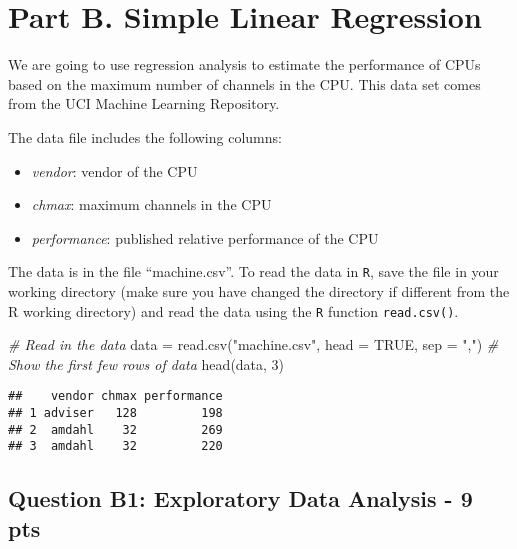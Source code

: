 \documentclass[
]{article}
\newenvironment{Shaded}{\begin{snugshade}}{\end{snugshade}}
\newcommand{\AttributeTok}[1]{\textcolor[rgb]{0.77,0.63,0.00}{#1}}
\newcommand{\CommentTok}[1]{\textcolor[rgb]{0.56,0.35,0.01}{\textit{#1}}}
\newcommand{\ConstantTok}[1]{\textcolor[rgb]{0.00,0.00,0.00}{#1}}
\newcommand{\DecValTok}[1]{\textcolor[rgb]{0.00,0.00,0.81}{#1}}
\newcommand{\FunctionTok}[1]{\textcolor[rgb]{0.00,0.00,0.00}{#1}}
\newcommand{\NormalTok}[1]{#1}
\newcommand{\OtherTok}[1]{\textcolor[rgb]{0.56,0.35,0.01}{#1}}
\newcommand{\StringTok}[1]{\textcolor[rgb]{0.31,0.60,0.02}{#1}}
\providecommand{\tightlist}{%
  \setlength{\itemsep}{0pt}\setlength{\parskip}{0pt}}
\begin{document}
\hypertarget{part-b.-simple-linear-regression}{%
\section{Part B. Simple Linear
Regression}\label{part-b.-simple-linear-regression}}

We are going to use regression analysis to estimate the performance of
CPUs based on the maximum number of channels in the CPU. This data set
comes from the UCI Machine Learning Repository.

The data file includes the following columns:

\begin{itemize}
\tightlist
\item
  \emph{vendor}: vendor of the CPU
\item
  \emph{chmax}: maximum channels in the CPU
\item
  \emph{performance}: published relative performance of the CPU
\end{itemize}

The data is in the file ``machine.csv''. To read the data in \texttt{R},
save the file in your working directory (make sure you have changed the
directory if different from the R working directory) and read the data
using the \texttt{R} function \texttt{read.csv()}.

\begin{Shaded}
\begin{Highlighting}[]
\CommentTok{\# Read in the data}
\NormalTok{data }\OtherTok{=} \FunctionTok{read.csv}\NormalTok{(}\StringTok{"machine.csv"}\NormalTok{, }\AttributeTok{head =} \ConstantTok{TRUE}\NormalTok{, }\AttributeTok{sep =} \StringTok{","}\NormalTok{)}
\CommentTok{\# Show the first few rows of data}
\FunctionTok{head}\NormalTok{(data, }\DecValTok{3}\NormalTok{)}
\end{Highlighting}
\end{Shaded}

\begin{verbatim}
##    vendor chmax performance
## 1 adviser   128         198
## 2  amdahl    32         269
## 3  amdahl    32         220
\end{verbatim}

\hypertarget{question-b1-exploratory-data-analysis---9-pts}{%
\subsection{Question B1: Exploratory Data Analysis - 9
pts}\label{question-b1-exploratory-data-analysis---9-pts}}
\end{document}
